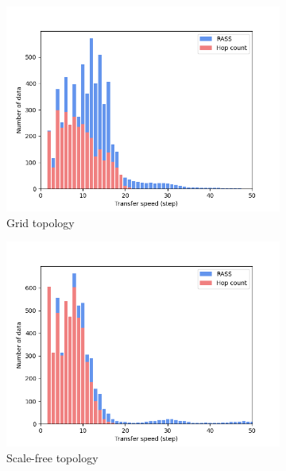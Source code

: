 \begin{figure}
    \centering
    \begin{subfigure}{0.45\textwidth}
        \includegraphics[width=\textwidth]{figures/dora_mesh/grid_speed.png}
        \caption{Grid topology}
        \label{results:grid_100_speed}
    \end{subfigure}
    \begin{subfigure}{0.45\textwidth}
        \includegraphics[width=\textwidth]{figures/dora_mesh/scale_speed.png}
        \caption{Scale-free topology}
        \label{results:scale_100_speed}
    \end{subfigure}
    \begin{subfigure}{0.45\textwidth}

\end{subfigure}
\end{figure}
